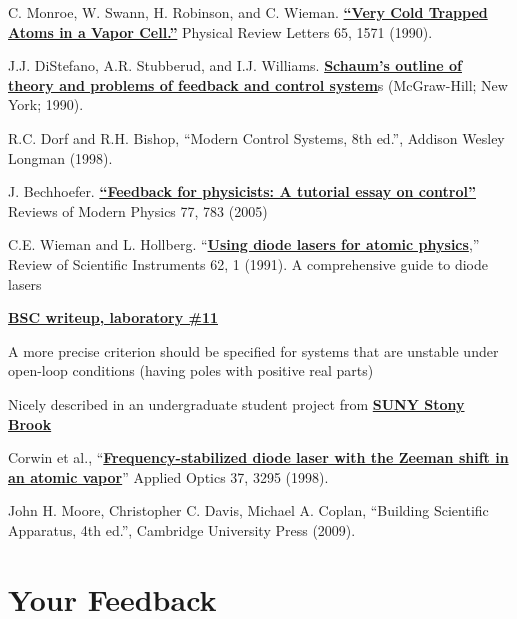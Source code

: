 \documentclass{../lab}
\begin{document}
\begin{thebibliography}{}
     C. Monroe, W. Swann, H. Robinson, and C. Wieman. \href{http://dev-physicsadv.pantheon.berkeley.edu/sites/default/files/images/Monroe\_etal.pdf}{\textbf{``Very Cold Trapped Atoms in a Vapor Cell.''}} Physical Review Letters 65, 1571 (1990).

     J.J. DiStefano, A.R. Stubberud, and I.J. Williams. \href{http://physics111.lib.berkeley.edu/Physics111/Reprints/MOT/Schaum's\%20Outline\%20Theory\%20and\%20Problems\%20of\%20Feedback\%20and\%20Control\%20Systems/}{\textbf{Schaum’s outline of theory and problems of feedback and control system}}s (McGraw-Hill; New York; 1990).

     R.C. Dorf and R.H. Bishop, ``Modern Control Systems, 8th ed.'', Addison Wesley Longman (1998).

     J. Bechhoefer. \href{http://journals.aps.org/rmp/pdf/10.1103/RevModPhys.77.783}{\textbf{``Feedback for physicists: A tutorial essay on control''}} Reviews of Modern Physics 77, 783 (2005)

     C.E. Wieman and L. Hollberg. ``\href{http://physics111.lib.berkeley.edu/Physics111/Reprints/MOT/Weiman\_in\_Denver\_MOT.pdf}{\textbf{Using diode lasers for atomic physics}},'' Review of Scientific Instruments 62, 1 (1991). A comprehensive guide to diode lasers

     \href{http://socrates.berkeley.edu/~phylabs/bsc/PDFFiles/bscLV-11.pdf}{\textbf{BSC writeup, laboratory \#11}}

     A more precise criterion should be specified for systems that are unstable under open-loop conditions (having poles with positive real parts)

     Nicely described in an undergraduate student project from \href{http://laser.physics.sunysb.edu/~simone/mini-project/}{\textbf{SUNY Stony Brook}}

     Corwin et al., ``\href{http://dev-physicsadv.pantheon.berkeley.edu/sites/default/files/images/Corwin\_DAVLL.pdf}{\textbf{Frequency-stabilized diode laser with the Zeeman shift in an atomic vapor}}'' Applied Optics 37, 3295 (1998).

     John H. Moore, Christopher C. Davis, Michael A. Coplan, ``Building Scientific Apparatus, 4th ed.'', Cambridge University Press (2009).
\end{thebibliography}

\section{Your Feedback}
\end{document}
